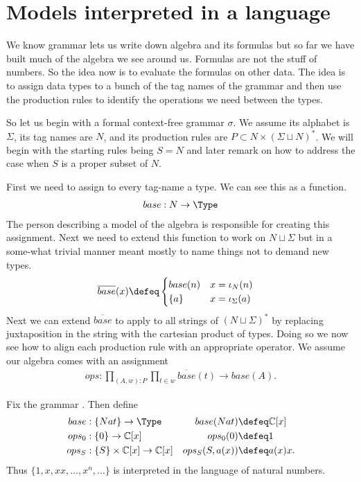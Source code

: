 \section{Models interpreted in a language}
We know grammar lets us write down algebra and its formulas but so 
far we have built much of the algebra we see around us.  Formulas 
are not the stuff of numbers.  So the idea now is to evaluate the 
formulas on other data. The idea is to assign data types to a 
bunch of the tag names of the grammar and then use the production 
rules to identify the operations we need between the types.

So let us begin with a formal context-free grammar $\sigma$.
We assume its alphabet is $\Sigma$, its tag names are $N$, 
and its production rules are $P\subset N\times (\Sigma\sqcup N)^*$.
We will begin with the starting rules being $S=N$ and later remark on 
how to address the case when $S$ is a proper subset of $N$.

First we need to assign to every tag-name a type.  We can see this 
as a function.
\begin{align*}
    base:N\to \Type
\end{align*}
The person describing a model of the algebra is responsible for 
creating this assignment.  Next we need to extend this function 
to work on $N\sqcup \Sigma$ but in a some-what trivial manner 
meant mostly to name things not to demand new types.
\begin{align*}
    \overline{base}(x) & \defeq \begin{cases}
        base(n) & x=\iota_N(n)\\
        \{a\} & x=\iota_{\Sigma}(a)
    \end{cases}
\end{align*}
Next we can extend $\overline{base}$ to apply to all 
strings of $(N\sqcup \Sigma)^*$ by replacing juxtaposition 
in the string with the cartesian product of types.  Doing so 
we now see how to align each production rule with an appropriate 
operator.  We assume 
our algebra comes with an assignment
\begin{align*}
    ops:\prod_{(A,w):P}\prod_{t\in w}\overline{base}(t)\to base(A).
\end{align*}


\begin{example}
    Fix the grammar .
    Then define 
    \begin{align*}
        base & : \{Nat\}\to \Type &
        base(Nat) & \defeq \mathbb{C}[x]\\
        ops_0 & : \{0\}\to \mathbb{C}[x] &  ops_0(0) & \defeq 1\\
        ops_S & : \{S\}\times \mathbb{C}[x]\to \mathbb{C}[x] &  ops_S(S,a(x)) & \defeq a(x)x.
    \end{align*}
    Thus $\{1,x,xx,\ldots, x^n,\ldots\}$ is interpreted in the language 
    of natural numbers.
\end{example}

